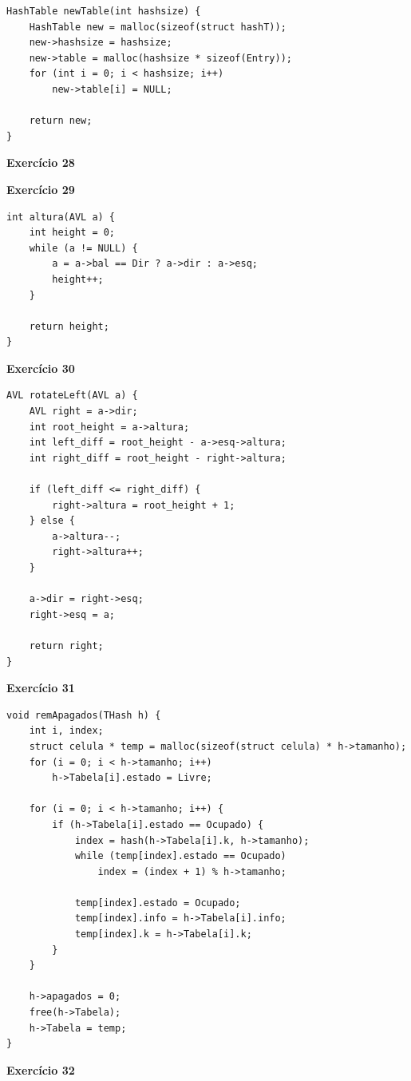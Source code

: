 \documentclass[a4paper,11pt]{article}
\begin{document}
\begin{verbatim}
HashTable newTable(int hashsize) {
	HashTable new = malloc(sizeof(struct hashT));
	new->hashsize = hashsize;
	new->table = malloc(hashsize * sizeof(Entry));
	for (int i = 0; i < hashsize; i++)
		new->table[i] = NULL;
	
	return new;
}
\end{verbatim}

\noindent \textbf{Exercício 28}



\noindent \textbf{Exercício 29}

\begin{verbatim}
int altura(AVL a) {
	int height = 0;
	while (a != NULL) {
		a = a->bal == Dir ? a->dir : a->esq;
		height++;
	}
	
	return height;
}
\end{verbatim}

\noindent \textbf{Exercício 30}

\begin{verbatim}
AVL rotateLeft(AVL a) {
	AVL right = a->dir;
	int root_height = a->altura;
	int left_diff = root_height - a->esq->altura;
	int right_diff = root_height - right->altura;
	
	if (left_diff <= right_diff) {
		right->altura = root_height + 1;
	} else {
		a->altura--;
		right->altura++;
	}
	
	a->dir = right->esq;
	right->esq = a;
	
	return right;
}
\end{verbatim}

\noindent \textbf{Exercício 31}

\begin{verbatim}
void remApagados(THash h) {
	int i, index;
	struct celula * temp = malloc(sizeof(struct celula) * h->tamanho);
	for (i = 0; i < h->tamanho; i++)
		h->Tabela[i].estado = Livre;
	
	for (i = 0; i < h->tamanho; i++) {
		if (h->Tabela[i].estado == Ocupado) {
			index = hash(h->Tabela[i].k, h->tamanho);
			while (temp[index].estado == Ocupado)
				index = (index + 1) % h->tamanho;
			
			temp[index].estado = Ocupado;
			temp[index].info = h->Tabela[i].info;
			temp[index].k = h->Tabela[i].k;
		}
	}
	
	h->apagados = 0;
	free(h->Tabela);
	h->Tabela = temp;
}
\end{verbatim}

\noindent \textbf{Exercício 32}
\end{document}
